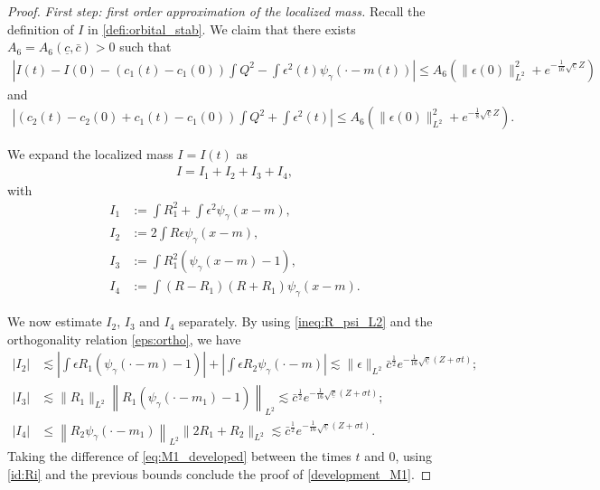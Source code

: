 \documentclass[10pt,a4paper]{amsart}
\begin{document}
	\begin{proof}
		
		\textit{First step: first order approximation of the localized mass.} Recall the definition of $I$ in \eqref{defi:orbital_stab}. We claim that there exists $A_6 = A_6(\underline{c}, \bar{c})>0$ such that 
		\begin{align}\label{development_M1}
			\left\vert I(t) - I(0) - \left( c_1(t) -c_1(0) \right) \int Q^2 - \int \epsilon^2(t)\psi_\gamma(\cdot-m(t)) \right\vert \leq A_6 \left( \| \epsilon(0) \|_{L^2}^2 + e^{-\frac1{16} \sqrt{\underline{c}} Z} \right)
		\end{align}
   and
   \begin{align}\label{development_M2}
			\left\vert \left( c_2(t) -c_2(0) + c_1(t) -c_1(0) \right) \int Q^2 + \int \epsilon^2(t) \right\vert \leq A_6 \left( \| \epsilon (0) \|_{L^2}^2 + e^{- \frac18 \sqrt{\underline{c}} Z} \right).
		\end{align}
		
		We expand the localized mass $I=I(t)$ as
		\begin{align}\label{eq:M1_developed}
			I = I_1 + I_2 + I_3 + I_4, 
		\end{align}
		with
		\begin{align*}
			 I_1 &:= \int R_1^2+\int \epsilon^2 \psi_\gamma (x-m), \\  
             I_2 &:= 2\int R\epsilon \psi_\gamma (x-m), \\ 
             I_3 &:= \int R_1^2 \left( \psi_\gamma(x-m)-1\right), \\
			 I_4 &:= \int (R-R_1)(R+R_1) \psi_\gamma(x -m).
		\end{align*}
		
		We now estimate $I_2$, $I_3$ and $I_4$ separately. By using \eqref{ineq:R_psi_L2} and  the orthogonality relation \eqref{eps:ortho}, we have
		\begin{align*}
			\left\vert I_2 \right\vert 
			& \lesssim \left\vert  \int \epsilon R_1 \left( \psi_\gamma(\cdot -m) -1\right) \right\vert + \left\vert  \int \epsilon R_2 \psi_\gamma(\cdot-m) \right\vert  \lesssim \| \epsilon \|_{L^2} \bar{c}^\frac12 e^{-\frac1{16}\sqrt{\underline{c}}\left( Z+ \sigma t\right)}; \\
			\left\vert I_3 \right\vert & \lesssim \| R_1 \|_{L^2} \left\| R_1 \left( \psi_\gamma \left( \cdot -m_1\right)-1 \right) \right\|_{L^2} \lesssim \bar{c}^{\frac12} e^{- \frac1{16} \sqrt{\underline{c}}\left( Z + \sigma t\right)}; \\
			\left\vert I_4 \right\vert &\leq \left\| R_2 \psi_\gamma \left( \cdot -m_1 \right) \right\|_ {L^2} \| 2R_1 + R_2 \|_{L^2} \lesssim \bar{c}^{\frac12} e^{- \frac1{16} \sqrt{\underline{c}}\left( Z + \sigma t\right)}.
		\end{align*}
		Taking the difference of \eqref{eq:M1_developed} between the times $t$ and $0$, using \eqref{id:Ri} and the previous bounds conclude the proof of \eqref{development_M1}. 
   

\end{proof}
\end{document}
